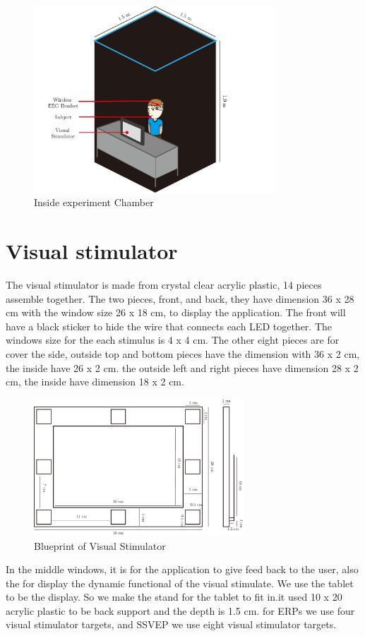 \begin{figure}[ht]
	\centering
	\includegraphics[width=0.8\textwidth]{chapter6/dark_wire_inside.pdf}
	\caption{Inside experiment Chamber}
\end{figure}
\section{Visual stimulator}

\hspace{1.5cm}The visual stimulator is made from crystal clear acrylic plastic, 14 pieces assemble together. The two pieces, front, and back, they have dimension 36 x 28 cm with the window size 26 x 18 cm, to display the application. The front will have a black sticker to hide the wire that connects each LED together. The windows size for the each stimulus is 4 x 4 cm. The other eight pieces are for cover the side, outside top and bottom pieces have the dimension with 36 x 2 cm, the inside have 26 x 2 cm. the outside left and right pieces have dimension 28 x 2 cm, the inside have dimension 18 x 2  cm.\\

\begin{figure}[ht]
	\centering
	\includegraphics[width=0.7\textwidth]{chapter6/blueprint.pdf}
	\caption{Blueprint of Visual Stimulator}
\end{figure}
In the middle windows, it is for the application to give feed back to the user, also the for display the dynamic functional of the visual stimulate. We use the tablet to be the display. So we make the stand for the tablet to fit in.it used 10 x 20 acrylic plastic to be back support and the depth is 1.5 cm. for ERPs we use four visual stimulator targets, and SSVEP we use eight visual stimulator targets. 



